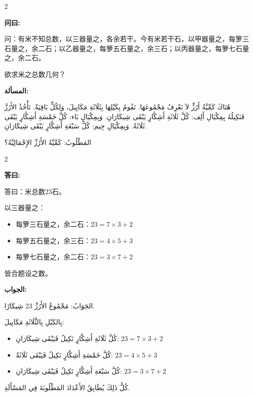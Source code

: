 \documentclass[11pt,a4paper]{article}
\newcommand{\ar}[1]{\arabicfont\beginR #1\endR}
\newenvironment{bilingual}{%
  \begin{paracol}{2}
}{%
  \end{paracol}
}
\newcommand{\cnlabel}[1]{\textcolor{algocolor}{\textbf{#1}}}
\newcommand{\arlabel}[1]{\ar{\textcolor{algocolor}{\textbf{#1}}}}
\begin{document}
\begin{bilingual}

\begin{leftcolumn*}
\cnlabel{问曰:}

问：有米不知总数，以三器量之，各余若干。今有米若干石，以甲器量之，每箩三石量之，余二石；以乙器量之，每箩五石量之，余三石；以丙器量之，每箩七石量之，余二石。

欲求米之总数几何？
\end{leftcolumn*}

\begin{rightcolumn*}
\arlabel{المسألة:}

\ar{هُنَاكَ كَمِّيَّةُ أَرُزٍّ لاَ نَعْرِفُ مَجْمُوعَهَا. نَقُومُ بِكَيْلِهَا بِثَلَاثَةِ مَكَايِيلَ، وَلِكُلٍّ بَاقِيَةٌ. نَأْخُذُ الأَرُزَّ فَنَكِيلُهُ بِمِكْيَالِ أَلِف: كُلَّ ثَلَاثَةِ أَشِكَّارٍ يَبْقَى شِيكَارَانِ. وَبِمِكْيَالِ بَاء: كُلَّ خَمْسَةِ أَشِكَّارٍ يَبْقَى ثَلَاثَةٌ. وَبِمِكْيَالِ جِيم: كُلَّ سَبْعَةِ أَشِكَّارٍ يَبْقَى شِيكَارَانِ.}

\ar{المَطْلُوبُ: كَمِّيَّةُ الأَرُزِّ الإِجْمَالِيَّةُ؟}
\end{rightcolumn*}

\end{bilingual}

\vspace{1em}

\begin{bilingual}

\begin{leftcolumn*}
\cnlabel{答曰:}

答曰：米总数23石。

以三器量之：
\begin{itemize}
  \item 每箩三石量之，余二石：$23 = 7 \times 3 + 2$
  \item 每箩五石量之，余三石：$23 = 4 \times 5 + 3$
  \item 每箩七石量之，余二石：$23 = 3 \times 7 + 2$
\end{itemize}

皆合题设之数。
\end{leftcolumn*}

\begin{rightcolumn*}
\arlabel{الجواب:}

\ar{الجَوَابُ: مَجْمُوعُ الأَرُزِّ 23 شِيكَارًا.}

\ar{بِالكَيْلِ بِالثَّلَاثَةِ مَكَايِيلَ:}
\begin{itemize}
  \item \ar{كُلَّ ثَلَاثَةِ أَشِكَّارٍ نَكِيلُ فَيَبْقَى شِيكَارَانِ: $23 = 7 \times 3 + 2$}
  \item \ar{كُلَّ خَمْسَةِ أَشِكَّارٍ نَكِيلُ فَيَبْقَى ثَلَاثَةٌ: $23 = 4 \times 5 + 3$}
  \item \ar{كُلَّ سَبْعَةِ أَشِكَّارٍ نَكِيلُ فَيَبْقَى شِيكَارَانِ: $23 = 3 \times 7 + 2$}
\end{itemize}

\ar{كُلُّ ذَلِكَ يُطَابِقُ الأَعْدَادَ المَطْلُوبَةَ فِي المَسْأَلَةِ.}
\end{rightcolumn*}

\end{bilingual}
\end{document}
